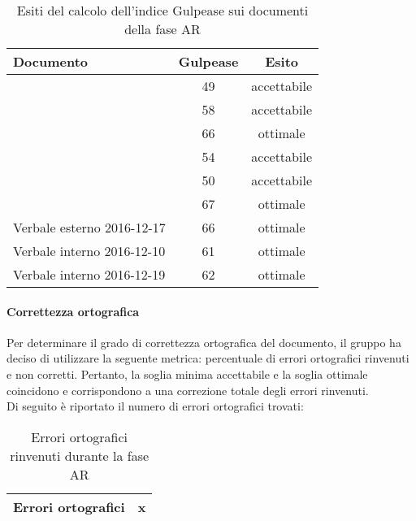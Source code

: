 \documentclass[PianoDiQualifica.tex]{subfiles}
\begin{document}
				\begin{table}[h]
				\centering
				\begin{tabular}{l c c}
					\hline
					\rule[-0.3cm]{0cm}{0.8cm}
					\textbf{Documento} & \textbf{Gulpease} & \textbf{Esito} \\
					\hline
					\rule[0cm]{0cm}{0.4cm}
					\PPdocRR & 49 & accettabile \\
					\rule[0cm]{0cm}{0.4cm}
					\NPdocRR & 58 & accettabile \\ 
					\rule[0cm]{0cm}{0.4cm}
					\ARdocRR & 66 & ottimale \\ 
					\rule[0cm]{0cm}{0.4cm}
					\PQdocRR & 54 & accettabile \\ 
					\rule[0cm]{0cm}{0.4cm}
					\Gldoc & 50 & accettabile\\ 
					\rule[0cm]{0cm}{0.4cm}
					\SDKdoc & 67 & ottimale \\ 
					\rule[0cm]{0cm}{0.4cm}
					Verbale esterno 2016-12-17 & 66 & ottimale\\ 
					\rule[0cm]{0cm}{0.4cm}
					Verbale interno 2016-12-10 & 61 & ottimale\\ 
					\rule[0cm]{0cm}{0.4cm}
					Verbale interno 2016-12-19 & 62 & ottimale\\ 
					
					\hline
				\end{tabular}
				\caption{Esiti del calcolo dell'indice Gulpease sui documenti della fase AR}
			\end{table}		
		\paragraph{Correttezza ortografica}
		Per determinare il grado di correttezza ortografica del documento, il gruppo ha deciso di utilizzare la seguente metrica: percentuale di errori ortografici rinvenuti e non corretti.
				Pertanto, la soglia minima accettabile e la soglia ottimale coincidono e corrispondono a una correzione totale degli errori rinvenuti.\\
				Di seguito è riportato il numero di errori ortografici trovati:\\
				
				\begin{table}[h]
				\centering
				\begin{tabular}{l c}
					\hline
					\rule[0cm]{0cm}{0.4cm}
					Errori ortografici & x \\
					\hline
				\end{tabular}
				\caption{Errori ortografici rinvenuti durante la fase AR}
			\end{table}		
			
\end{document}
